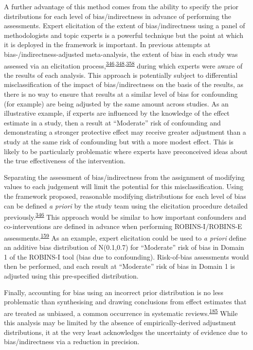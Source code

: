 \documentclass[a4paper, twoside]{templates/ociamthesis}
\begin{document}
A further advantage of this method comes from the ability to specify the prior distributions for each level of bias/indirectness in advance of performing the assessments. Expert elicitation of the extent of bias/indirectness using a panel of methodologists and topic experts is a powerful technique but the point at which it is deployed in the framework is important. In previous attempts at bias-/indirectness-adjusted meta-analysis, the extent of bias in each study was assessed via an elicitation process,\textsuperscript{\protect\hyperlink{ref-turner2009}{346},\protect\hyperlink{ref-thompson2011}{348},\protect\hyperlink{ref-wilks2011}{358}} during which experts were aware of the results of each analysis. This approach is potentially subject to differential misclassification of the impact of bias/indirectness on the basis of the results, as there is no way to ensure that results at a similar level of bias for confounding (for example) are being adjusted by the same amount across studies. As an illustrative example, if experts are influenced by the knowledge of the effect estimate in a study, then a result at ``Moderate'' risk of confounding and demonstrating a stronger protective effect may receive greater adjustment than a study at the same risk of confounding but with a more modest effect. This is likely to be particularly problematic where experts have preconceived ideas about the true effectiveness of the intervention.

Separating the assessment of bias/indirectness from the assignment of modifying values to each judgement will limit the potential for this misclassification. Using the framework proposed, reasonable modifying distributions for each level of bias can be defined \emph{a priori} by the study team using the elicitation procedure detailed previously.\textsuperscript{\protect\hyperlink{ref-turner2009}{346}} This approach would be similar to how important confounders and co-interventions are defined in advance when performing ROBINS-I/ROBINS-E assessments.\textsuperscript{\protect\hyperlink{ref-sterne2016}{159}} As an example, expert elicitation could be used to \emph{a priori} define an additive bias distribution of N(0.1,0.7) for ``Moderate'' risk of bias in Domain 1 of the ROBINS-I tool (bias due to confounding). Risk-of-bias assessments would then be performed, and each result at ``Moderate'' risk of bias in Domain 1 is adjusted using this pre-specified distribution.

Finally, accounting for bias using an incorrect prior distribution is no less problematic than synthesising and drawing conclusions from effect estimates that are treated as unbiased, a common occurrence in systematic reviews.\textsuperscript{\protect\hyperlink{ref-katikireddi2015}{185}} While this analysis may be limited by the absence of empirically-derived adjustment distributions, it at the very least acknowledges the uncertainty of evidence due to bias/indirectness via a reduction in precision.
\end{document}
